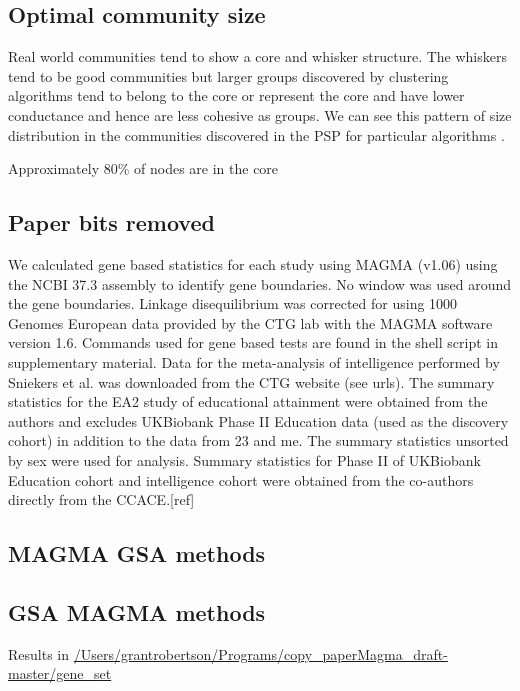 \subsection{Optimal community size}
\label{sec:optimal community size}
Real world communities tend to show a core and whisker structure. The whiskers tend to be good communities but larger groups discovered by clustering algorithms tend to belong to the core or represent the core and have lower conductance and hence are less cohesive as groups. We can see this pattern of size distribution in the communities discovered in the PSP for particular algorithms .

Approximately 80\% of nodes are in the core 

\cite{leskovec2010empirical}
\subsection{Paper bits removed}
We calculated gene based statistics for each study using MAGMA (v1.06) using the NCBI 37.3 assembly to identify gene boundaries. \cite{de2015magma}   No window was used around the gene boundaries. Linkage disequilibrium was corrected for using 1000 Genomes European data provided by the CTG lab with the MAGMA software version 1.6.\cite{de2015magma}  Commands used for gene based tests are found in the shell script in supplementary material. Data for the meta-analysis of intelligence performed by Sniekers  et al. was downloaded from the CTG website (see urls). \cite{sniekers2017genome}  The summary statistics for the EA2 study of educational attainment were obtained from the authors and excludes UKBiobank Phase II Education data (used as the discovery cohort) in addition to the data from 23 and me. \cite{okbay2016genome}  The summary statistics unsorted by sex were used for analysis. Summary statistics for Phase II of UKBiobank Education cohort and intelligence cohort were obtained from the co-authors directly from the CCACE.[ref]

\subsection{MAGMA GSA methods}

\subsection{GSA MAGMA methods}
Results in \url{/Users/grantrobertson/Programs/copy_paperMagma_draft-master/gene_set}

